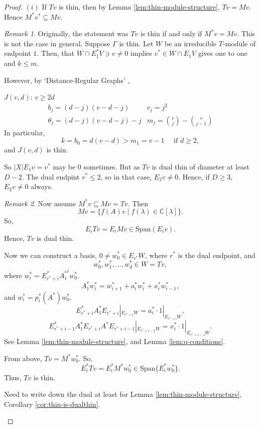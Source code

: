 \documentclass[
]{book}
\theoremstyle{definition}
\theoremstyle{definition}
\theoremstyle{definition}
\theoremstyle{definition}
\theoremstyle{remark}
\newtheorem*{remark}{Remark}
\begin{document}
\begin{proof}
\leavevmode

\((i)\) If \(Tv\) is thin, then by Lemma \ref{lem:thin-module-structure}, \(Tv = Mv\). Hence \(M^*v^* \subseteq Mv\).

\begin{remark}
Originally, the statement was \(Tv\) is thin if and only if \(M^*v = Mv\). This is not the case in general. Suppose \(\Gamma\) is thin. Let \(W\) be an irreducible \(T\)-module of endpoint \(1\). Then, that \(W \cap E^*_1V \ni v \neq 0\) implies \(v^*\in W\cap E_1V\) gives one to one and \(k\leq m\).

However, by `Distance-Regular Graphs' \citep{bcn},

\(J(v,d)\): \(v\geq 2d\)
\begin{align}
b_j = (d-j)(v-d-j) & c_j = j^2\\
\theta_j = (d-j)(v-d-j)-j & m_j = \binom{v}{j}-\binom{v}{j-1}
\end{align}
In particular,
\[k = b_0 = d(v-d) > m_1 = v-1 \quad \text{ if }d\geq 2,\]
and \(J(v,d)\) is thin.

So \(|X|E_1v = v^*\) may be \(0\) sometimes. But as \(Tv\) is dual thin of diameter at least \(D-2\). The dual endpint \(r^*\leq 2\), so in that case, \(E_2v \neq 0\). Hence, if \(D\geq 3\), \(E_2v\neq 0\) always.
\end{remark}

\begin{remark}
Now assume \(M^*v\subseteq Mv = Tv\). Then
\[Mv = \{f(A)v\mid f(\lambda)\in \mathbb{C}[\lambda]\}.\]
So,
\[E_iTv = E_iMv \in \mathrm{Span}(E_iv).\]
Hence, \(Tv\) is dual thin.

Now we can construct a basis,
\(0\neq w^*_0\in E_{r^*}W\), where \(r^*\) is the dual endpoint, and
\[w^*_0, w^*_1, \ldots, w^*_d\in W = Tv,\]
where \(w^*_i = E^*_{r^*+i}{A^*_1}^iw^*_0\).
\[A^*_1w^*_i = w^*_{i+1}+ a_i^*w^*_i + x^*_iw^*_{i-1},\]
and \(w^*_i = p^*_i(A^*)w^*_0\).
\[E^*_{r^*+i}A^*_1E_{r^*+i}|_{E_{r^*+i}W} = a^*_i\cdot 1|_{E_{r^*+i}W},\]
\[E^*_{r^*+i-1}A^*_1E_{r^*+i}A^*E_{r^*+i-1}|_{E_{r^*+i-1}W} = x^*_i\cdot 1|_{E_{r^*+i-1}W}.\]
See Lemma \ref{lem:thin-module-structure}, and Lemma \ref{lem:q-conditions}.

From above, \(Tv = M^*w^*_0\). So,
\[E^*_iTv = E^*_iM^*w^*_0 \in \mathrm{Span}\{E^*_iw^*_0\}.\]
Thus, \(Tv\) is thin.

\ast Need to write down the dual at least for Lemma \ref{lem:thin-module-structure}, Corollary \ref{cor:thin-is-dualthin}.
\end{remark}


\end{proof}
\end{document}

